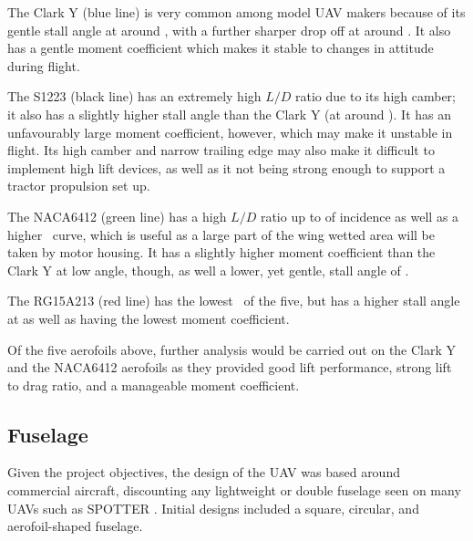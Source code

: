 \documentclass[../../main.tex]{subfiles}
\begin{document}
The Clark Y (blue line) is very common among model UAV makers because of its gentle stall angle at around , with a further sharper drop off at around .
It also has a gentle moment coefficient which makes it stable to changes in attitude during flight. 

The S1223 (black line) has an extremely high $L/D$ ratio due to its high camber; it also has a slightly higher stall angle than the Clark Y (at around ).
It has an unfavourably large moment coefficient, however, which may make it unstable in flight.
Its high camber and narrow trailing edge may also make it difficult to implement high lift devices, as well as it not being strong enough to support a tractor propulsion set up.

The NACA6412  (green line) has a high $L/D$ ratio up to  of incidence as well as a higher \cla\, curve, which is useful as a large part of the wing wetted area will be taken by motor housing.
It has a slightly higher moment coefficient than the Clark Y at low angle, though, as well a lower, yet gentle, stall angle of .

The RG15A213 (red line) has the lowest \cla\, of the five, but has a higher stall angle at  as well as having the lowest moment coefficient.

Of the five aerofoils above, further analysis would be carried out on the Clark Y and the NACA6412 aerofoils as they provided good lift performance, strong lift to drag ratio, and a manageable moment coefficient.


\subsection{Fuselage} \label{sec:design-process:preliminary-design:fuselage}

Given the project objectives, the design of the UAV was based around commercial aircraft, discounting any lightweight or double fuselage seen on many UAVs such as SPOTTER \cite{spotter-19}. 
Initial designs included a square, circular, and aerofoil-shaped fuselage.

\end{document}
